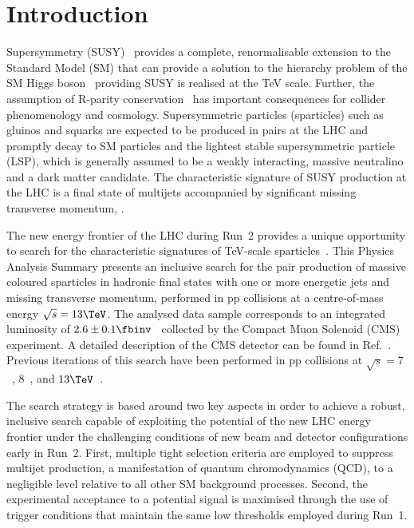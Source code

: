 \section{Introduction}
\label{sec:introduction}

Supersymmetry (SUSY)~\cite{ref:SUSY-1, ref:SUSY0, ref:SUSY1,
  ref:SUSY2, ref:SUSY3, ref:SUSY4, ref:hierarchy1, ref:hierarchy2}
provides a complete, renormalisable extension to the Standard Model
(SM) that can provide a solution to the hierarchy problem of the SM
Higgs boson~\cite{ref:atlashiggsdiscovery, ref:cmshiggsdiscovery}
providing SUSY is realised at the TeV scale. Further, the assumption
of R-parity conservation~\cite{Farrar:1978xj} has important
consequences for collider phenomenology and cosmology. Supersymmetric
particles (sparticles) such as gluinos and squarks are expected to be
produced in pairs at the LHC and promptly decay to SM particles and
the lightest stable supersymmetric particle (LSP), which is generally
assumed to be a weakly interacting, massive neutralino and a dark
matter candidate. The characteristic signature of SUSY production at
the LHC is a final state of multijets accompanied by significant
missing transverse momentum, \ptvecmiss.

The new energy frontier of the LHC during Run~2 provides a unique
opportunity to search for the characteristic signatures of TeV-scale
sparticles~\cite{atlas-12, atlas-13, cms-12, cms-13}. This Physics
Analysis Summary presents an inclusive search for the pair production
of massive coloured sparticles in hadronic final states with one or
more energetic jets and missing transverse momentum, performed in pp
collisions at a centre-of-mass energy $\sqrt{s} = 13\TeV$. The
analysed data sample corresponds to an integrated luminosity of $2.6
\pm 0.1 \fbinv$~\cite{lumi} collected by the Compact Muon Solenoid
(CMS) experiment. A detailed description of the CMS detector can be
found in Ref.~\cite{ref:CMS}. Previous iterations of this search have
been performed in pp collisions at $\sqrt{s} = 7$~\cite{RA1Paper,
  RA1Paper2011, RA1Paper2011FULL}, $8$~\cite{RA1Paper2012, RA1Parked},
and $13\TeV$~\cite{RA1Paper2015}.

The search strategy is based around two key aspects in order to
achieve a robust, inclusive search capable of exploiting the potential
of the new LHC energy frontier under the challenging conditions of new
beam and detector configurations early in Run~2. First, multiple tight
selection criteria are employed to suppress multijet production, a
manifestation of quantum chromodynamics (QCD), to a negligible level
relative to all other SM background processes. Second, the
experimental acceptance to a potential signal is maximised through the
use of trigger conditions that maintain the same low thresholds
employed during Run~1.

